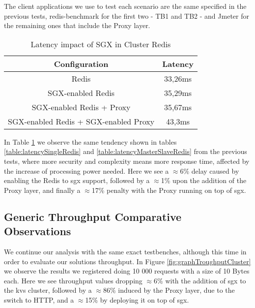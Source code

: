 The client applications we use to test each scenario are the same specified in the previous tests, redis-benchmark for the first two - TB1 and TB2 - and Jmeter for the remaining ones that include the Proxy layer.

\begin{table}[ht]
	\caption{Latency impact of SGX in Cluster Redis} %
	\centering %
	\begin{tabular}{c c} %
		\hline\hline %
		\textbf{Configuration} & \textbf{Latency} \\ [0.5ex] %
		\hline
		Redis & 33,26ms\\
		\hline
		SGX-enabled Redis & 35,29ms \\
		\hline
		SGX-enabled Redis + Proxy & 35,67ms \\
		\hline %
		SGX-enabled Redis + SGX-enabled Proxy & 43,3ms\\ [1ex] %
		\hline %
	\end{tabular}
	\label{table:latencyClusterRedis} %
\end{table}

In Table \ref{table:latencyClusterRedis} we observe the same tendency shown in tables \ref{table:latencySingleRedis} and \ref{table:latencyMasterSlaveRedis} from the previous tests, where more security and complexity means more response time, affected by the increase of processing power needed.
Here we see a $\approx$6\% delay caused by enabling the Redis to \gls{sgx} support, followed by a $\approx$1\% upon the addition of the Proxy layer, and finally a $\approx$17\% penalty with the Proxy running on top of \gls{sgx}.

\subsection{Generic Throughput Comparative Observations}

We continue our analysis with the same exact testbenches, although this time in order to evaluate our solutions throughput. In Figure \ref{fig:graphTroughputCluster} we observe the results we registered doing 10 000 requests with a size of 10 Bytes each. 
Here we see throughput values dropping $\approx$6\% with the addition of \gls{sgx} to the \gls{kvs} cluster, followed by a $\approx$86\% induced by the Proxy layer, due to the switch to HTTP, and a $\approx$15\% by deploying it on top of \gls{sgx}.

